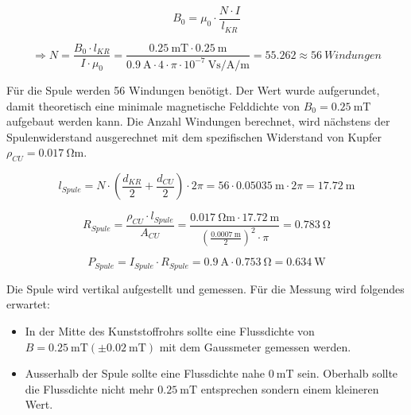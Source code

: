 \documentclass[../main.tex]{subfiles}
\begin{document}
\begin{equation}
  B_{0} = {\mu}_0\cdot \frac{N \cdot I}{l_{KR}}
  \label{equ:flussdichte}
\end{equation}

\begin{equation}
  \Rightarrow N = \frac{B_0\cdot l_{KR}}{I \cdot {\mu}_0} = \frac{\SI{0.25}{\milli\tesla}\cdot \SI{0.25}{\metre}}{\SI{0.9}{\ampere}\cdot 4 \cdot \pi \cdot 10^{-7}\SI[parse-numbers = false]{}{\volt\second\per\ampere\per\metre}} = 55.262 \approx 56\ Windungen 
  \label{equ:windungen_calc}
\end{equation}

Für die Spule werden 56 Windungen benötigt. Der Wert wurde aufgerundet, damit theoretisch eine minimale magnetische Felddichte von $B_0 = \SI{0.25}{\milli\tesla}$ aufgebaut werden kann. Die Anzahl Windungen berechnet, wird nächstens der Spulenwiderstand ausgerechnet mit dem spezifischen Widerstand von Kupfer $ {\rho}_{CU} = \SI{0.017}{\ohm\metre}$.

\begin{equation}
    l_{Spule} = N \cdot (\frac{d_{KR}}{2}+\frac{d_{CU}}{2}) \cdot 2 \pi = 56 \cdot \SI{0.05035}{\metre} \cdot 2 \pi  = \SI{17.72}{\metre}
    \label{equ:wire_length}
\end{equation}

\begin{equation}
  R_{Spule} = \frac{{\rho}_{CU} \cdot l_{Spule}}{A_{CU}} = \frac{\SI{0.017}{\ohm\metre} \cdot \SI{17.72}{\metre}}{(\frac{\SI{0.0007}{\metre}}{2})^2\cdot \pi} = \SI{0.783}{\ohm}
  \label{equ:wire_resistance}
\end{equation}

\begin{equation}
  P_{Spule} = I_{Spule} \cdot R_{Spule} = \SI{0.9}{\ampere} \cdot \SI{0.753}{\ohm} = \SI{0.634}{\watt}
  \label{equ:wire_power}
\end{equation}

Die Spule wird vertikal aufgestellt und gemessen. Für die Messung wird folgendes erwartet:

\begin{itemize}
  \item In der Mitte des Kunststoffrohrs sollte eine Flussdichte von $B = \SI{0.25}{\milli\tesla} (\pm \SI{0.02}{\milli\tesla})$ mit dem Gaussmeter gemessen werden.
  \item Ausserhalb der Spule sollte eine Flussdichte nahe $\SI{0}{\milli\tesla}$ sein. Oberhalb sollte die Flussdichte nicht mehr $\SI{0.25}{\milli\tesla}$ entsprechen sondern einem kleineren Wert.
\end{itemize}
\end{document}
